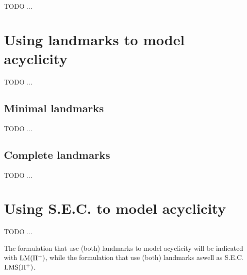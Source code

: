 TODO ...

\section{Using landmarks to model acyclicity}
TODO ...

\subsection{Minimal landmarks}
TODO ...

\subsection{Complete landmarks}
TODO ...

\section{Using S.E.C. to model acyclicity}
TODO ...

The formulation that use (both) landmarks to model acyclicity will be indicated with $\mbox{LM}(\Pi^+)$, while the formulation that use (both) landmarks aswell as S.E.C. $\mbox{LMS}(\Pi^+)$.